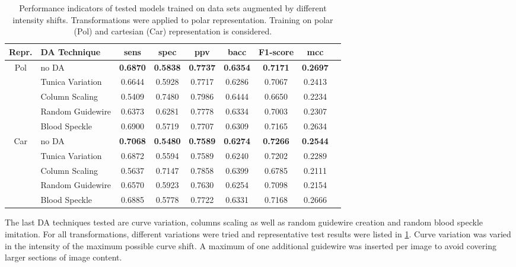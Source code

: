 \begin{table}[H]
    \centering
    \begin{tabular}{|c|l|c|c|c|c|c|c|c|}
        \hline
        Repr. & DA Technique & \acrshort{sens} & \acrshort{spec} & \acrshort{ppv} & \acrshort{bacc} & F1-score & \acrshort{mcc} \\\hline\hline
        \multirow{5}{2em}{Pol} & no DA & \textbf{0.6870} & \textbf{0.5838} & \textbf{0.7737} & \textbf{0.6354} & \textbf{0.7171} & \textbf{0.2697} \\
         & Tunica Variation & 0.6644 & 0.5928 & 0.7717 & 0.6286 & 0.7067 & 0.2413 \\
         & Column Scaling & 0.5409 & 0.7480 & 0.7986 & 0.6444 & 0.6650 & 0.2234 \\
         & Random Guidewire & 0.6373 & 0.6281 & 0.7778 & 0.6334 & 0.7003 & 0.2307 \\
         & Blood Speckle & 0.6900 & 0.5719 & 0.7707 & 0.6309 & 0.7165 & 0.2634 \\
        \hline
        \multirow{5}{2em}{Car} & no DA & \textbf{0.7068} & \textbf{0.5480} & \textbf{0.7589} & \textbf{0.6274} & \textbf{0.7266} & \textbf{0.2544} \\
         & Tunica Variation & 0.6872 & 0.5594 & 0.7589 & 0.6240 & 0.7202 & 0.2289 \\
         & Column Scaling & 0.5637 & 0.7147 & 0.7858 & 0.6399 & 0.6785 & 0.2111 \\
         & Random Guidewire & 0.6570 & 0.5923 & 0.7630 & 0.6254 & 0.7098 & 0.2154 \\
         & Blood Speckle & 0.6885 & 0.5778 & 0.7722 & 0.6331 & 0.7168 & 0.2666 \\
        \hline
    \end{tabular}
    \caption[Artefact imitation]{Performance indicators of tested models trained on data sets augmented by different intensity shifts. Transformations were applied to polar representation. Training on polar (Pol) and cartesian (Car) representation is considered.}
    \label{tab:da_results3}
\end{table}
The last DA techniques tested are curve variation, columns scaling as well as random guidewire creation and random blood speckle imitation. For all transformations, different variations were tried and representative test results were listed in \cref{tab:da_results3}. Curve variation was varied in the intensity of the maximum possible curve shift. A maximum of one additional guidewire was inserted per image to avoid covering larger sections of image content.

